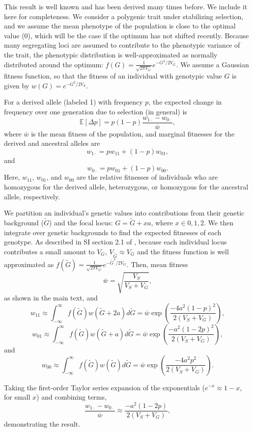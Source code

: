 \documentclass{article}
\newcommand{\E}{\mathbb{E}}
\begin{document}
This result is well known and has been derived many times before. We include it
here for completeness. We consider a polygenic trait under stabilizing
selection, and we assume the mean phenotype of the population is close to the
optimal value (0), which will be the case if the optimum has not shifted
recently. Because many segregating loci are assumed to contribute to the
phenotypic variance of the trait, the phenotypic distribution is
well-approximated as normally distributed around the optimum:
\(f(G)=\frac{1}{\sqrt{2\pi V_G}} e^{-G^2/2V_G}\). We assume a Gaussian fitness
function, so that the fitness of an individual with genotypic value $G$ is
given by \(w(G)=e^{-G^2/2V_S}\).

For a derived allele (labeled 1) with frequency $p$, the expected change in
frequency over one generation due to selection (in general) is
\[\E[\Delta p]=p(1-p)\frac{w_{1\cdot}-w_{0\cdot}}{\bar{w}},\]
where \(\bar{w}\) is the mean fitness of the population, and marginal fitnesses
for the derived and ancestral alleles are
\[w_{1\cdot}=p w_{11} + (1-p)w_{01},\]
and
\[w_{0\cdot}=p w_{01} + (1-p)w_{00}.\]
Here, $w_{11}$, $w_{01}$, and $w_{00}$ are the relative fitnesses of
individuals who are homozygous for the derived allele, heterozygous, or
homozygous for the ancestral allele, respectively.

We partition an individual's genetic values into contributions from their
genetic background ($\tilde{G}$) and the focal locus: $G=\tilde{G}+xa$, where
$x\in{0,1,2}$.  We then integrate over genetic backgrounds to find the expected
fitnesses of each genotype. As described in SI section 2.1 of
\citet{simons2018population}, because each individual locus contributes a small
amount to $V_G$, $V_{\tilde{G}}\approx V_G$ and the fitness function is well
approximated as \(f(\tilde{G})=\frac{1}{\sqrt{2\pi
V_G}}e^{-\tilde{G}^2/2V_G}\). Then, mean fitness
\[
    \bar{w} = \sqrt{\frac{V_S}{V_S+V_G}},
\]
as shown in the main text, and
\[ 
    w_{11} \approx \int_{-\infty}^\infty f(\tilde{G}) w(\tilde{G} + 2a) d\tilde{G}
    = \bar{w}\exp{\left(\frac{-4a^2(1-p)^2}{2(V_S+V_G)}\right)},
\]
\[
    w_{01} \approx \int_{-\infty}^\infty f(\tilde{G}) w(\tilde{G} + a) d\tilde{G}
    = \bar{w}\exp{\left(\frac{-a^2(1-2p)^2}{2(V_S+V_G)}\right)},
\]
and
\[
    w_{00} \approx \int_{-\infty}^\infty f(\tilde{G}) w(\tilde{G}) d\tilde{G}
    = \bar{w}\exp{\left(\frac{-4a^2p^2}{2(V_S+V_G)}\right)}.
\]

Taking the first-order Taylor series expansion of the exponentials
($e^{-x}\approx1-x$, for small $x$) and combining terms,
\[
    \frac{w_{1\cdot} - w_{0\cdot}}{\bar{w}} \approx \frac{-a^2(1-2p)}{2(V_S+V_G)},
\]
demonstrating the result.
\end{document}
